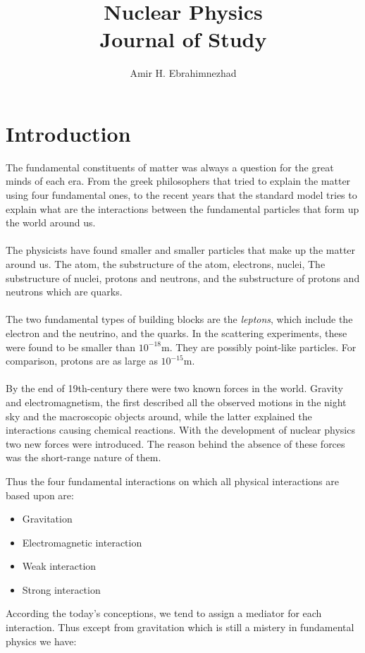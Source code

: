 \documentclass[11pt,a4paper]{article}
\title{Nuclear Physics \\ \large Journal of Study}
\author{Amir H. Ebrahimnezhad}
\begin{document}
\maketitle
\tableofcontents

\section{Introduction}
The fundamental constituents of matter was always a question for the great minds of each era. From the greek philosophers that tried to explain the matter using four fundamental ones, to the recent years that the standard model tries to explain what are the interactions between the fundamental particles that form up the world around us.
\\
\\
The physicists have found smaller and smaller particles that make up the matter around us. The atom, the substructure of the atom, electrons, nuclei, The substructure of nuclei, protons and neutrons, and the substructure of protons and neutrons which are quarks. 
\\
\\
The two fundamental types of building blocks are the \textit{leptons}, which include the electron and the neutrino, and the quarks. In the scattering experiments, these were found to be smaller than $10^{-18}$m. They are possibly point-like particles.  For comparison, protons are as large as $10^{-15}$m. 
\\
\\
By the end of 19th-century there were two known forces in the world. Gravity and electromagnetism, the first described all the observed motions in the night sky and the macroscopic objects around, while the latter explained the interactions causing chemical reactions. With the development of nuclear physics two new forces were introduced. The reason behind the absence of these forces was the short-range nature of them.

Thus the four fundamental interactions on which all physical interactions are based upon are:
\begin{itemize}
     \item Gravitation
     \item Electromagnetic interaction
     \item Weak interaction
     \item Strong interaction
\end{itemize}

According the today's conceptions, we tend to assign a mediator for each interaction. Thus except from gravitation which is still a mistery in fundamental physics we have:
\end{document}
